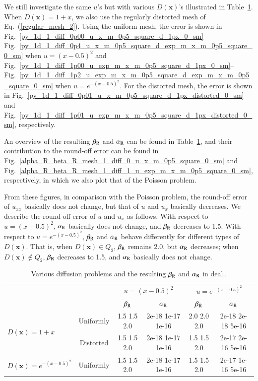 \documentclass[review,3p]{elsarticle}
\begin{document}
We still investigate the same $u$'s but with various $D(\mathbf{x})$'s illustrated in Table~\ref{results_various_d_for_beta_r_decrease_1d_dealii}. When $D(\mathbf{x}) = 1+x$, we also use the regularly distorted mesh of Eq.~(\ref{regular_mesh_2}).
Using the uniform mesh, the error is shown in Fig.~\ref{py_1d_1_diff_0p00_u_x_m_0p5_square_d_1px_0_sm}--Fig.~\ref{py_1d_1_diff_0p4_u_x_m_0p5_square_d_exp_m_x_m_0p5_square_0_sm} when $u=(x-0.5)^2$ and Fig.~\ref{py_1d_1_diff_1p00_u_exp_m_x_m_0p5_square_d_1px_0_sm}--Fig.~\ref{py_1d_1_diff_1p2_u_exp_m_x_m_0p5_square_d_exp_m_x_m_0p5_square_0_sm} when $u=e^{-(x-0.5)^2}$.
For the distorted mesh, the error is shown in Fig.~\ref{py_1d_1_diff_0p01_u_x_m_0p5_square_d_1px_distorted_0_sm} and Fig.~\ref{py_1d_1_diff_1p01_u_exp_m_x_m_0p5_square_d_1px_distorted_0_sm}, respectively.

An overview of the resulting $\beta_{\rm R}$ and $\alpha_{\rm R}$ can be found in Table~\ref{results_various_d_for_beta_r_decrease_1d_dealii}, and their contribution to the round-off error can be found in Fig.~\ref{alpha_R_beta_R_mesh_1_diff_0_u_x_m_0p5_square_0_sm} and Fig.~\ref{alpha_R_beta_R_mesh_1_diff_1_u_exp_m_x_m_0p5_square_0_sm}, respectively, in which we also plot that of the Poisson problem.

From these figures, in comparison with the Poisson problem, the round-off error of $u_{xx}$ basically does not change, but that of $u$ and $u_x$ basically decreases. 
We describe the round-off error of $u$ and $u_x$ as follows.
With respect to $u=(x-0.5)^2$, $\alpha_{\rm R}$ basically does not change, and $\beta_{\rm R}$ decreases to 1.5.
With respect to $u=e^{-(x-0.5)^2}$, $\beta_{\rm R}$ and $\alpha_{\rm R}$ behave differently for different types of $D(\mathbf{x})$. That is, when $D(\mathbf{x}) \in Q_2$,  $\beta_{\rm R}$ remains 2.0, but $\alpha_{\rm R}$ decreases; when $D(\mathbf{x}) \notin Q_2$, $\beta_{\rm R}$ decreases to 1.5, and $\alpha_{\rm R}$ basically does not change.


\begin{table}[!ht]
\caption{Various diffusion problems and the resulting $\beta_{\rm R}$ and $\alpha_{\rm R}$ in deal..}
\centering
\scriptsize
\begin{tabular}{l|c|c|c|c|c}
 \multicolumn{2}{c|}{} & \multicolumn{2}{c|}{$u=(x-0.5)^2$} & \multicolumn{2}{c}{$u=e^{-(x-0.5)^2}$} \\ \cline{3-6}
 \multicolumn{2}{c|}{} & $\beta_{\rm R}$ & $\alpha_{\rm R}$ & $\beta_{\rm R}$ & $\alpha_{\rm R}$ \\ \hline  
 \multirow{2}{*}{$D(\mathbf{x}) = 1+x$} & Uniformly & 1.5 1.5 2.0 & 2e-18 1e-17 1e-16 & 2.0 2.0 2.0 & 2e-18 2e-18 5e-16 \\ \cline{2-6} 
 & Distorted & 1.5 1.5 2.0 & 2e-18 1e-17 1e-16 & 1.5 1.5 2.0 & 2e-17 2e-16 5e-16 \\ \hline
 $D(\mathbf{x}) = e^{-(x-0.5)^2}$ & Uniformly & {1.5 1.5} 2.0 & 2e-18 1e-17 1e-16 & {1.5 1.5} 2.0 & 2e-17 1e-16 5e-16 \\ 
\end{tabular}
\label{results_various_d_for_beta_r_decrease_1d_dealii}
\end{table}
\end{document}
